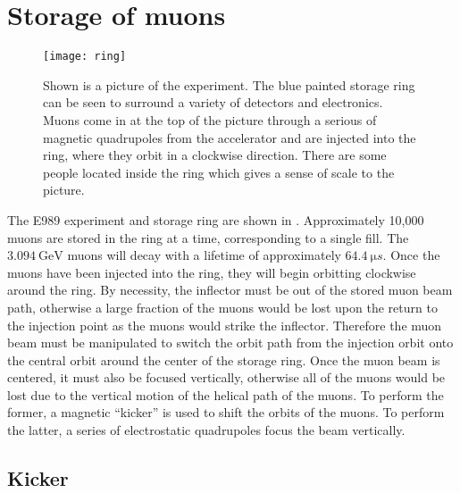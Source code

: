 \section{Storage of muons}
\label{sec:Storage}

\begin{figure}[]
    \centering
    \texttt{[image: ring]}
    \caption[The \gmtwo experiment]{Shown is a picture of the \gmtwo experiment. The blue painted storage ring can be seen to surround a variety of detectors and electronics. Muons come in at the top of the picture through a serious of magnetic quadrupoles from the accelerator and are injected into the ring, where they orbit in a clockwise direction. There are some people located inside the ring which gives a sense of scale to the picture.}   
    \label{fig:ring}
\end{figure}


The E989 experiment and storage ring are shown in . Approximately 10,000 muons are stored in the \gmtwo ring at a time, corresponding to a single fill. The $\SI{3.094}{\GeV}$ muons will decay with a lifetime of approximately $\SI{64.4}{\micro s}$. Once the muons have been injected into the ring, they will begin orbitting clockwise around the ring. By necessity, the inflector must be out of the stored muon beam path, otherwise a large fraction of the muons would be lost upon the return to the injection point as the muons would strike the inflector. Therefore the muon beam must be manipulated to switch the orbit path from the injection orbit onto the central orbit around the center of the storage ring. Once the muon beam is centered, it must also be focused vertically, otherwise all of the muons would be lost due to the vertical motion of the helical path of the muons. To perform the former, a magnetic ``kicker'' is used to shift the orbits of the muons. To perform the latter, a series of electrostatic quadrupoles focus the beam vertically.

\subsection{Kicker}
\label{sub:kicker}

